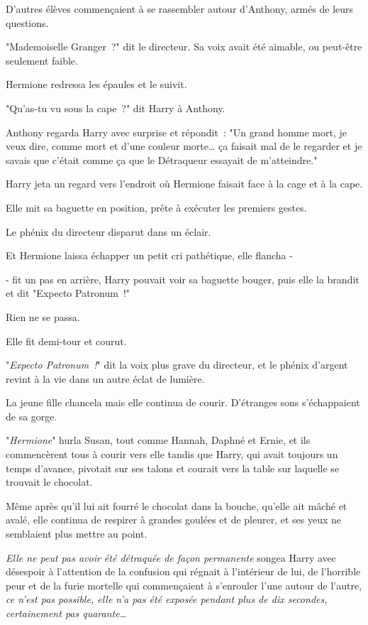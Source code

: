 D'autres élèves commençaient à se rassembler autour d'Anthony, armés de leurs questions.

"Mademoiselle Granger~?" dit le directeur. Sa voix avait été aimable, ou peut-être seulement faible.

Hermione redressa les épaules et le suivit.

"Qu'as-tu vu sous la cape~?" dit Harry à Anthony.

Anthony regarda Harry avec surprise et répondit~: "Un grand homme mort, je veux dire, comme mort et d'une couleur morte… ça faisait mal de le regarder et je savais que c'était comme ça que le Détraqueur essayait de m'atteindre."

Harry jeta un regard vers l'endroit où Hermione faisait face à la cage et à la cape.

Elle mit sa baguette en position, prête à exécuter les premiers gestes.

Le phénix du directeur disparut dans un éclair.

Et Hermione laissa échapper un petit cri pathétique, elle flancha -

- fit un pas en arrière, Harry pouvait voir sa baguette bouger, puis elle la brandit et dit "Expecto Patronum~!"

Rien ne se passa.

Elle fit demi-tour et courut.

"\emph{Expecto Patronum~!}" dit la voix plus grave du directeur, et le phénix d'argent revint à la vie dans un autre éclat de lumière.

La jeune fille chancela mais elle continua de courir. D'étranges sons s'échappaient de sa gorge.

"\emph{Hermione}" hurla Susan, tout comme Hannah, Daphné et Ernie, et ils commencèrent tous à courir vers elle tandis que Harry, qui avait toujours un temps d'avance, pivotait sur ses talons et courait vers la table sur laquelle se trouvait le chocolat.

Même après qu'il lui ait fourré le chocolat dans la bouche, qu'elle ait mâché et avalé, elle continua de respirer à grandes goulées et de pleurer, et ses yeux ne semblaient plus mettre au point.

\emph{Elle ne peut pas avoir été détraquée de façon permanente} songea Harry avec désespoir à l'attention de la confusion qui régnait à l'intérieur de lui, de l'horrible peur et de la furie mortelle qui commençaient à s'enrouler l'une autour de l'autre, \emph{ce n'est pas possible, elle n'a pas été exposée pendant plus de dix secondes, certainement pas quarante…}

